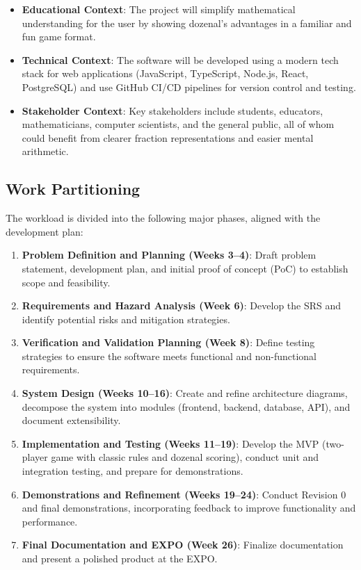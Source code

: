 \documentclass[12pt]{article}
\begin{document}
\begin{itemize}
    \item \textbf{Educational Context}: The project will simplify mathematical understanding for the user by showing dozenal's advantages in a familiar and fun game format.
    \item \textbf{Technical Context}: The software will be developed using a modern tech stack for web applications (JavaScript, TypeScript, Node.js, React, PostgreSQL) and use GitHub CI/CD pipelines for version control and testing.
    \item \textbf{Stakeholder Context}: Key stakeholders include students, educators, mathematicians, computer scientists, and the general public, all of whom could benefit from clearer fraction representations and easier mental arithmetic.
\end{itemize}

\subsection{Work Partitioning}

The workload is divided into the following major phases, aligned with the development plan:

\begin{enumerate}
    \item \textbf{Problem Definition and Planning (Weeks 3--4)}: Draft problem statement, development plan, and initial proof of concept (PoC) to establish scope and feasibility.
    \item \textbf{Requirements and Hazard Analysis (Week 6)}: Develop the SRS and identify potential risks and mitigation strategies.
    \item \textbf{Verification and Validation Planning (Week 8)}: Define testing strategies to ensure the software meets functional and non-functional requirements.
    \item \textbf{System Design (Weeks 10--16)}: Create and refine architecture diagrams, decompose the system into modules (frontend, backend, database, API), and document extensibility.
    \item \textbf{Implementation and Testing (Weeks 11--19)}: Develop the MVP (two-player game with classic rules and dozenal scoring), conduct unit and integration testing, and prepare for demonstrations.
    \item \textbf{Demonstrations and Refinement (Weeks 19--24)}: Conduct Revision 0 and final demonstrations, incorporating feedback to improve functionality and performance.
    \item \textbf{Final Documentation and EXPO (Week 26)}: Finalize documentation and present a polished product at the EXPO.
\end{enumerate}
\end{document}
